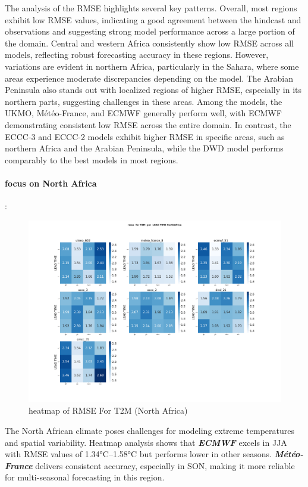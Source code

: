 The analysis of the RMSE highlights several key patterns. Overall, most regions exhibit low RMSE values, indicating a good agreement between the hindcast and observations and suggesting strong model performance across a large portion of the domain. Central and western Africa consistently show low RMSE across all models, reflecting robust forecasting accuracy in these regions. However, variations are evident in northern Africa, particularly in the Sahara, where some areas experience moderate discrepancies depending on the model. The Arabian Peninsula also stands out with localized regions of higher RMSE, especially in its northern parts, suggesting challenges in these areas. Among the models, the UKMO, Météo-France, and ECMWF generally perform well, with ECMWF demonstrating consistent low RMSE across the entire domain. In contrast, the ECCC-3 and ECCC-2 models exhibit higher RMSE in specific areas, such as northern Africa and the Arabian Peninsula, while the DWD model performs comparably to the best models in most regions. 
\paragraph{focus on North Africa} : 
\begin{figure}[H]
\centering
\includegraphics[scale=0.3]{plots/det/rmse/rmse_T2M_NorthAfrica.png}
\caption{heatmap of RMSE For T2M  (North Africa)}
\end{figure}

The North African climate poses challenges for modeling extreme temperatures and spatial variability. Heatmap analysis shows that \textbf{\textit{ECMWF}} excels in JJA with RMSE values of 1.34°C–1.58°C but performs lower in other seasons. \textbf{\textit{Météo-France}} delivers consistent accuracy, especially in SON, making it more reliable for multi-seasonal forecasting in this region.
\vspace{1.5cm}
